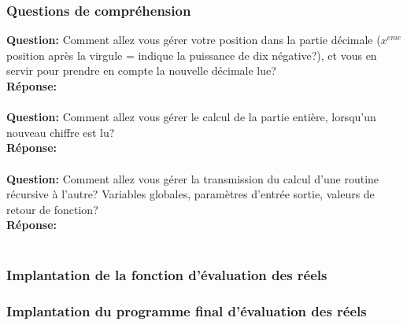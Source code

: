 \documentclass[./standalone.tex]{subfiles}
\begin{document}
\subsubsection{Questions de compréhension}
\medskip

\textbf{Question:} Comment allez vous gérer votre position dans la partie décimale ($x^{eme}$ position après la virgule = indique la puissance de dix négative?), et vous en servir pour prendre en compte la nouvelle décimale lue? \\

\textbf{Réponse:} \\\\


\textbf{Question:} Comment allez vous gérer le calcul de la partie entière, lorsqu'un nouveau chiffre est lu? \\

\textbf{Réponse:} \\\\

\textbf{Question:} Comment allez vous gérer la transmission du calcul d'une routine récursive à l'autre? Variables globales, paramètres d'entrée sortie, valeurs de retour de fonction?\\

\textbf{Réponse:} \\\\

\subsubsection{Implantation de la fonction d'évaluation des réels}

\subsubsection{Implantation du programme final d'évaluation des réels}
\end{document}
